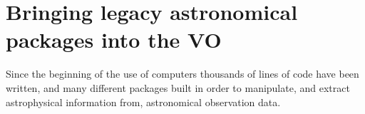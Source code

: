 \chapter{Bringing legacy astronomical packages into the VO} %
\label{cha:bringing_legacy_astronomical_packages_into_the_vo}

	Since the beginning of the use of computers thousands of lines
	of code have been written, and many different packages built in
	order to manipulate, and extract astrophysical information
	from, astronomical observation data.
	
	


